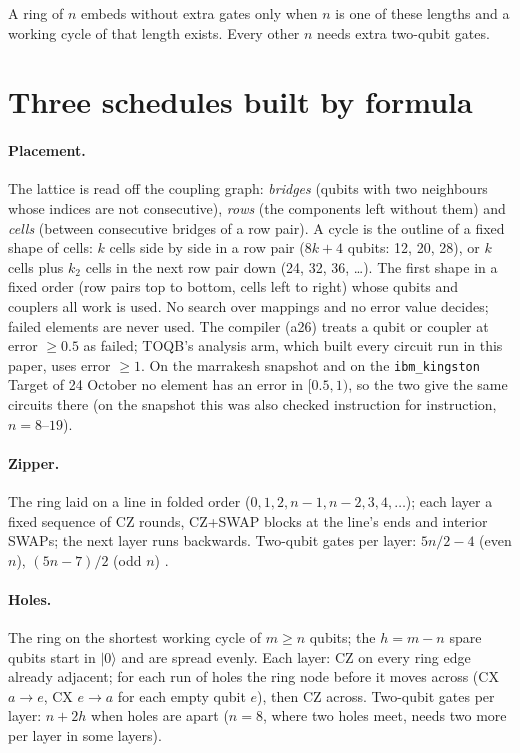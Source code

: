 \documentclass[11pt]{article}
\begin{document}
A ring of $n$ embeds without extra gates only when $n$ is one of these lengths and a working cycle of that length exists.
Every other $n$ needs extra two-qubit gates.

\section{Three schedules built by formula}

\paragraph{Placement.} The lattice is read off the coupling graph: \emph{bridges} (qubits with two neighbours whose
indices are not consecutive), \emph{rows} (the components left without them) and \emph{cells} (between consecutive
bridges of a row pair). A cycle is the outline of a fixed shape of cells: $k$ cells side by side in a row pair
($8k+4$ qubits: 12, 20, 28), or $k$ cells plus $k_2$ cells in the next row pair down (24, 32, 36, \dots). The first
shape in a fixed order (row pairs top to bottom, cells left to right) whose qubits and couplers all work is used. No
search over mappings and no error value decides; failed elements are never used. The compiler (a26) treats a qubit or
coupler at error $\ge 0.5$ as failed; TOQB's analysis arm, which built every circuit run in this paper, uses error
$\ge 1$. On the marrakesh snapshot and on the \texttt{ibm\_kingston} Target of 24 October no element has an error in
$[0.5, 1)$, so the two give the same circuits there (on the snapshot this was also checked instruction for
instruction, $n = 8$--$19$).

\paragraph{Zipper.} The ring laid on a line in folded order ($0, 1, 2, n-1, n-2, 3, 4, \dots$); each layer a fixed
sequence of CZ rounds, CZ+SWAP blocks at the line's ends and interior SWAPs; the next layer runs backwards. Two-qubit
gates per layer: $5n/2-4$ (even $n$), $(5n-7)/2$ (odd $n$) \cite{paper3,toqb}.

\paragraph{Holes.} The ring on the shortest working cycle of $m \ge n$ qubits; the $h = m-n$ spare qubits start in
$|0\rangle$ and are spread evenly. Each layer: CZ on every ring edge already adjacent; for each run of holes the ring
node before it moves across (CX $a \to e$, CX $e \to a$ for each empty qubit $e$), then CZ across. Two-qubit gates per layer:
$n + 2h$ when holes are apart ($n = 8$, where two holes meet, needs two more per layer in some layers).
\end{document}
